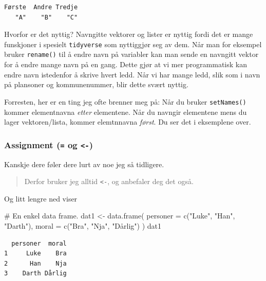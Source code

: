 \documentclass[
  letterpaper,
  DIV=11,
  numbers=noendperiod]{scrartcl}
\newenvironment{Shaded}{\begin{snugshade}}{\end{snugshade}}
\newcommand{\AttributeTok}[1]{\textcolor[rgb]{0.40,0.45,0.13}{#1}}
\newcommand{\CommentTok}[1]{\textcolor[rgb]{0.37,0.37,0.37}{#1}}
\newcommand{\FunctionTok}[1]{\textcolor[rgb]{0.28,0.35,0.67}{#1}}
\newcommand{\NormalTok}[1]{\textcolor[rgb]{0.00,0.23,0.31}{#1}}
\newcommand{\OtherTok}[1]{\textcolor[rgb]{0.00,0.23,0.31}{#1}}
\newcommand{\StringTok}[1]{\textcolor[rgb]{0.13,0.47,0.30}{#1}}
\begin{document}
\begin{verbatim}
Første  Andre Tredje 
   "A"    "B"    "C" 
\end{verbatim}

Hvorfor er det nyttig? Navngitte vektorer og lister er nyttig fordi det
er mange funskjoner i spesielt \texttt{tidyverse} som nyttiggjør seg av
dem. Når man for eksempel bruker \texttt{rename()} til å endre navn på
variabler kan man sende en navngitt vektor for å endre mange navn på en
gang. Dette gjør at vi mer programmatisk kan endre navn istedenfor å
skrive hvert ledd. Når vi har mange ledd, slik som i navn på plansoner
og kommunenummer, blir dette svært nyttig.

Forresten, her er en ting jeg ofte brenner meg på: Når du bruker
\texttt{setNames()} kommer elementnavna \emph{etter} elementene. Når du
navngir elementene mens du lager vektoren/lista, kommer elemtnnavna
\emph{først}. Du ser det i eksemplene over.

\hypertarget{assignment-og--}{%
\subsubsection{\texorpdfstring{Assignment (\texttt{=} og
\texttt{\textless{}-})}{Assignment (= og \textless-)}}\label{assignment-og--}}

Kanskje dere føler dere lurt av noe jeg så tidligere.

\begin{quote}
Derfor bruker jeg alltid \texttt{\textless{}-}, og anbefaler deg det
også.
\end{quote}

Og litt lengre ned viser

\begin{Shaded}
\begin{Highlighting}[]
\CommentTok{\# En enkel data frame.}
\NormalTok{dat1 }\OtherTok{\textless{}{-}} \FunctionTok{data.frame}\NormalTok{(}
  \AttributeTok{personer =} \FunctionTok{c}\NormalTok{(}\StringTok{"Luke"}\NormalTok{, }\StringTok{"Han"}\NormalTok{, }\StringTok{"Darth"}\NormalTok{),}
  \AttributeTok{moral =} \FunctionTok{c}\NormalTok{(}\StringTok{"Bra"}\NormalTok{, }\StringTok{"Nja"}\NormalTok{, }\StringTok{"Dårlig"}\NormalTok{)}
\NormalTok{)}
\NormalTok{dat1}
\end{Highlighting}
\end{Shaded}

\begin{verbatim}
  personer  moral
1     Luke    Bra
2      Han    Nja
3    Darth Dårlig
\end{verbatim}
\end{document}
